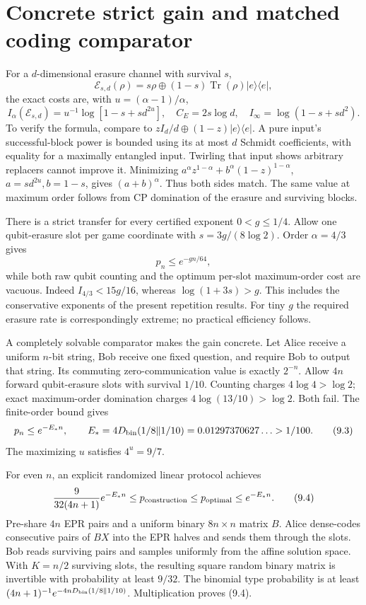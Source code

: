\documentclass[11pt,reqno]{amsart}
\numberwithin{equation}{section}
\begin{document}
\section{Concrete strict gain and matched coding comparator}\label{concrete-strict-gain-and-matched-coding-comparator}

For a \(d\)-dimensional erasure channel with survival \(s\), \[
 \mathcal E_{s,d}(\rho)=s\rho\oplus(1-s)\operatorname{Tr}(\rho)|e\rangle\langle e|,
\] the exact costs are, with \(u=(\alpha-1)/\alpha\), \[
 I_\alpha(\mathcal E_{s,d})
 =u^{-1}\log[1-s+s d^{2u}],\quad
 C_E=2s\log d,\quad I_\infty=\log(1-s+sd^2). \tag{9.1}
\] To verify the formula, compare to \(zI_d/d\oplus(1-z)|e\rangle\langle e|\). A pure input's successful-block power is bounded using its at most \(d\) Schmidt coefficients, with equality for a maximally entangled input. Twirling that input shows arbitrary replacers cannot improve it. Minimizing \(a^\alpha z^{1-\alpha}+b^\alpha(1-z)^{1-\alpha}\), \(a=sd^{2u},b=1-s\), gives \((a+b)^\alpha\). Thus both sides match. The same value at maximum order follows from CP domination of the erasure and surviving blocks.

There is a strict transfer for every certified exponent \(0<g\le1/4\). Allow one qubit-erasure slot per game coordinate with \(s=3g/(8\log2)\). Order \(\alpha=4/3\) gives \[
 p_n\le e^{-gn/64}, \tag{9.2}
\] while both raw qubit counting and the optimum per-slot maximum-order cost are vacuous. Indeed \(I_{4/3}<15g/16\), whereas \(\log(1+3s)>g\). This includes the conservative exponents of the present repetition results. For tiny \(g\) the required erasure rate is correspondingly extreme; no practical efficiency follows.

A completely solvable comparator makes the gain concrete. Let Alice receive a uniform \(n\)-bit string, Bob receive one fixed question, and require Bob to output that string. Its commuting zero-communication value is exactly \(2^{-n}\). Allow \(4n\) forward qubit-erasure slots with survival \(1/10\). Counting charges \(4\log4>\log2\); exact maximum-order domination charges \(4\log(13/10)>\log2\). Both fail. The finite-order bound gives \[
 p_n\le e^{-E_*n},\qquad
 E_*=4D_{\rm bin}(1/8\Vert1/10)
      =0.01297370627\ldots>1/100. \tag{9.3}
\] The maximizing \(u\) satisfies \(4^u=9/7\).

For even \(n\), an explicit randomized linear protocol achieves \[
 \frac9{32(4n+1)}e^{-E_*n}
 \le p_{\rm construction}\le p_{\rm optimal}\le e^{-E_*n}. \tag{9.4}
\] Pre-share \(4n\) EPR pairs and a uniform binary \(8n\times n\) matrix \(B\). Alice dense-codes consecutive pairs of \(BX\) into the EPR halves and sends them through the slots. Bob reads surviving pairs and samples uniformly from the affine solution space. With \(K=n/2\) surviving slots, the resulting square random binary matrix is invertible with probability at least \(9/32\). The binomial type probability is at least \((4n+1)^{-1}e^{-4nD_{\rm bin}(1/8\Vert1/10)}\). Multiplication proves (9.4).
\end{document}
